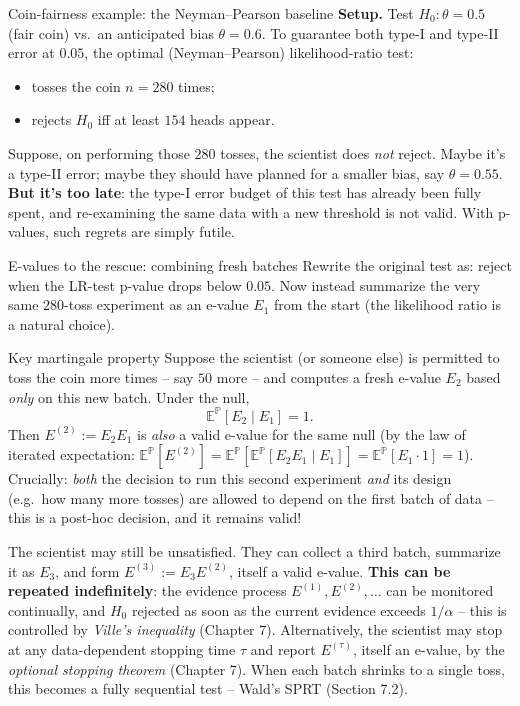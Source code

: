 \documentclass[aspectratio=169,10pt]{beamer}
\begin{document}
\begin{frame}{Coin-fairness example: the Neyman--Pearson baseline}
  \textbf{Setup.} Test $H_0:\theta=0.5$ (fair coin) vs.\ an anticipated bias
  $\theta=0.6$. To guarantee both type-I and type-II error at $0.05$, the
  optimal (Neyman--Pearson) likelihood-ratio test:
  \begin{itemize}
    \item tosses the coin $n=280$ times;
    \item rejects $H_0$ iff at least $154$ heads appear.
  \end{itemize}
  Suppose, on performing those $280$ tosses, the scientist does \emph{not}
  reject. Maybe it's a type-II error; maybe they should have planned for a
  smaller bias, say $\theta=0.55$. \textbf{But it's too late}: the type-I
  error budget of this test has already been fully spent, and re-examining
  the same data with a new threshold is not valid. With p-values, such
  regrets are simply futile.
\end{frame}

\begin{frame}[allowframebreaks]{E-values to the rescue: combining fresh batches}
  Rewrite the original test as: reject when the LR-test p-value drops below
  $0.05$. Now instead summarize the very same $280$-toss experiment as an
  e-value $E_1$ from the start (the likelihood ratio is a natural choice).

  \begin{block}{Key martingale property}
    Suppose the scientist (or someone else) is permitted to toss the coin
    more times -- say $50$ more -- and computes a fresh e-value $E_2$ based
    \emph{only} on this new batch. Under the null,
    \[
      \mathbb E^{\mathbb P}[E_2\mid E_1] = 1.
    \]
    Then $E^{(2)} := E_2 E_1$ is \emph{also} a valid e-value for the same
    null (by the law of iterated expectation:
    $\mathbb E^{\mathbb P}[E^{(2)}]=\mathbb E^{\mathbb P}[\mathbb E^{\mathbb P}[E_2E_1\mid E_1]]=\mathbb E^{\mathbb P}[E_1\cdot1]=1$).
    Crucially: \emph{both} the decision to run this second experiment
    \emph{and} its design (e.g.\ how many more tosses) are allowed to depend
    on the first batch of data -- this is a post-hoc decision, and it
    remains valid!
  \end{block}

  \framebreak
  The scientist may still be unsatisfied. They can collect a third batch,
  summarize it as $E_3$, and form $E^{(3)} := E_3 E^{(2)}$, itself a valid
  e-value. \textbf{This can be repeated indefinitely}: the evidence process
  $E^{(1)}, E^{(2)}, \dots$ can be monitored continually, and $H_0$ rejected
  as soon as the current evidence exceeds $1/\alpha$ -- this is controlled
  by \emph{Ville's inequality} (Chapter 7). Alternatively, the scientist may
  stop at any data-dependent stopping time $\tau$ and report $E^{(\tau)}$,
  itself an e-value, by the \emph{optional stopping theorem} (Chapter 7).
  When each batch shrinks to a single toss, this becomes a fully sequential
  test -- Wald's SPRT (Section 7.2).
\end{frame}
\end{document}
